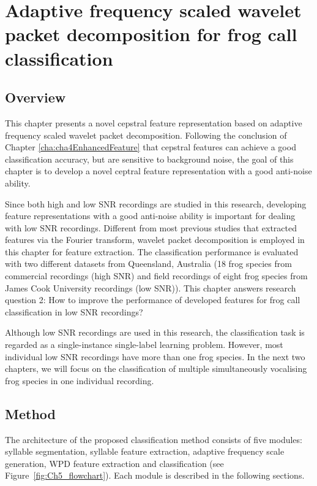 
\chapter{Adaptive frequency scaled wavelet packet decomposition for frog call classification}
\label{cha:cha5WaveletFeature}


\section{Overview}
This chapter presents a novel cepstral feature representation based on adaptive frequency scaled wavelet packet decomposition. Following the conclusion of Chapter \ref{cha:cha4EnhancedFeature} that cepstral features can achieve a good classification accuracy, but are sensitive to background noise, the goal of this chapter is to develop a novel ceptral feature representation with a good anti-noise ability.



Since both high and low SNR recordings are studied in this research, developing feature representations with a good anti-noise ability is important for dealing with low SNR recordings. Different from most previous studies that extracted features via the Fourier transform, wavelet packet decomposition is employed in this chapter for feature extraction. The classification performance is evaluated with two different datasets from Queensland, Australia (18 frog species from commercial recordings (high SNR) and field recordings of eight frog species from James Cook University recordings (low SNR)). This chapter answers research question 2: How to improve the performance of developed features for frog call classification in low SNR recordings? 


Although low SNR recordings are used in this research, the classification task is regarded as a single-instance single-label learning problem.
However, most individual low SNR recordings have more than one frog species. In the next two chapters, we will focus on the classification of multiple simultaneously vocalising frog species in one individual recording.





\section{Method}
The architecture of the proposed classification method consists of five modules: syllable segmentation, syllable feature extraction, adaptive frequency scale generation, WPD feature extraction and classification (see Figure~\ref{fig:Ch5_flowchart}). Each module is described in the following sections. 


